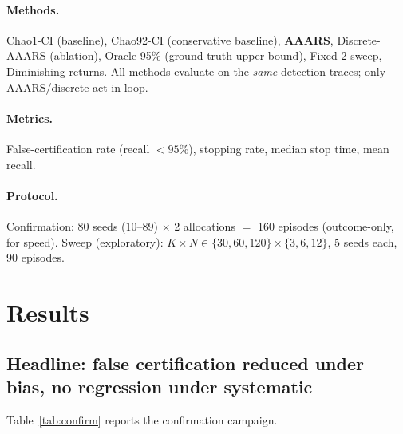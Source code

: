 \documentclass[11pt]{article}
\begin{document}
\paragraph{Methods.}
Chao1-CI (baseline), Chao92-CI (conservative baseline), \textbf{AAARS}, Discrete-AAARS (ablation),
Oracle-95\% (ground-truth upper bound), Fixed-2 sweep, Diminishing-returns. All methods evaluate on
the \emph{same} detection traces; only AAARS/discrete act in-loop.

\paragraph{Metrics.}
False-certification rate (recall $<95\%$), stopping rate, median stop time, mean recall.

\paragraph{Protocol.}
Confirmation: 80 seeds ($10$--$89$) $\times$ 2 allocations $=$ 160 episodes (outcome-only, for
speed). Sweep (exploratory): $K\times N \in \{30,60,120\}\times\{3,6,12\}$, 5 seeds each, 90
episodes.

\section{Results}
\label{sec:results}

\subsection{Headline: false certification reduced under bias, no regression under systematic}
Table~\ref{tab:confirm} reports the confirmation campaign.
\end{document}
